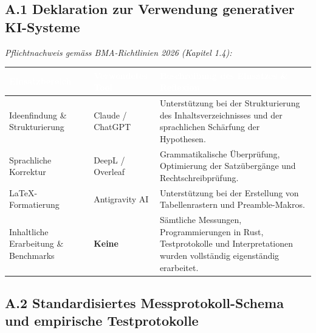 \documentclass[12pt,a4paper]{scrartcl}
\begin{document}
\subsection{A.1 Deklaration zur Verwendung generativer KI-Systeme}
\label{sec:ki_deklaration}

\noindent
\textit{Pflichtnachweis gemäss BMA-Richtlinien 2026 (Kapitel 1.4):}

\vspace{0.3cm}
\renewcommand{\arraystretch}{1.3}
\noindent
\begin{tabularx}{\linewidth}{|p{3.8cm}|p{3.2cm}|X|}
    \hline
    \rowcolor{primaryTeal}
    \textcolor{white}{\textbf{Einsatzbereich}} &
    \textcolor{white}{\textbf{Verwendetes Tool}} &
    \textcolor{white}{\textbf{Beschreibung des Einsatzes \& Reflexion}} \\ \hline
    Ideenfindung \& Strukturierung & Claude / ChatGPT & Unterstützung bei der Strukturierung des Inhaltsverzeichnisses und der sprachlichen Schärfung der Hypothesen. \\ \hline
    Sprachliche Korrektur & DeepL / Overleaf & Grammatikalische Überprüfung, Optimierung der Satzübergänge und Rechtschreibprüfung. \\ \hline
    LaTeX-Formatierung & Antigravity AI & Unterstützung bei der Erstellung von Tabellenrastern und Preamble-Makros. \\ \hline
    Inhaltliche Erarbeitung \& Benchmarks & \textbf{Keine} & Sämtliche Messungen, Programmierungen in Rust, Testprotokolle und Interpretationen wurden vollständig eigenständig erarbeitet. \\ \hline
\end{tabularx}

\vspace{0.8cm}

\subsection{A.2 Standardisiertes Messprotokoll-Schema und empirische Testprotokolle}
\label{sec:messprotokoll_schema}

\renewcommand{\arraystretch}{1.15}
\end{document}
